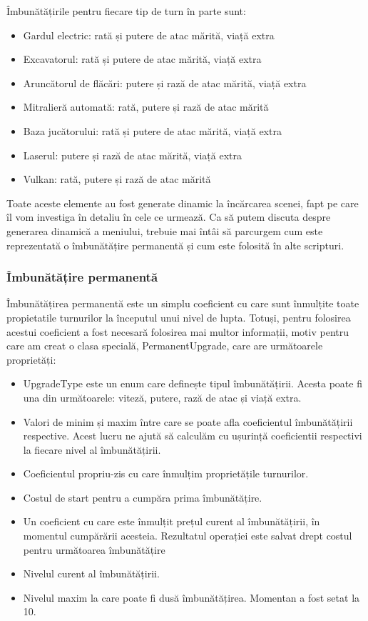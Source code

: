 \documentclass[12pt, a4paper]{article}
\begin{document}
	Îmbunătățirile pentru fiecare tip de turn în parte sunt:
	
	\begin{itemize}
		\item Gardul electric: rată și putere de atac mărită, viață extra
		\item Excavatorul: rată și putere de atac mărită, viață extra
		\item Aruncătorul de flăcări: putere și rază de atac mărită, viață extra
		\item Mitralieră automată: rată, putere și rază de atac mărită
		\item Baza jucătorului: rată și putere de atac mărită, viață extra
		\item Laserul: putere și rază de atac mărită, viață extra
		\item Vulkan: rată, putere și rază de atac mărită
	\end{itemize}
	
	Toate aceste elemente au fost generate dinamic la încărcarea scenei, fapt pe care îl vom investiga în detaliu în cele ce urmează. Ca să putem discuta despre generarea dinamică a meniului, trebuie mai întâi să parcurgem cum este reprezentată o îmbunătățire permanentă și cum este folosită în alte scripturi.
	
	
	
	
	
	\subsubsection{Îmbunătățire permanentă}
	
	Îmbunătățirea permanentă este un simplu coeficient cu care sunt înmulțite toate propietatile turnurilor la începutul unui nivel de lupta. Totuși, pentru folosirea acestui coeficient a fost necesară folosirea mai multor informații, motiv pentru care am creat o clasa specială, PermanentUpgrade, care are următoarele proprietăți:
	
	\begin{itemize}
		\item UpgradeType este un enum care definește tipul îmbunătățirii. Acesta poate fi una din următoarele: viteză, putere, rază de atac și viață extra.
		\item Valori de minim și maxim între care se poate afla coeficientul îmbunătățirii respective. Acest lucru ne ajută să calculăm cu ușurință coeficientii respectivi la fiecare nivel al îmbunătățirii.
		\item Coeficientul propriu-zis cu care înmulțim proprietățile turnurilor.
		\item Costul de start pentru a cumpăra prima îmbunătățire.
		\item Un coeficient cu care este înmulțit prețul curent al îmbunătățirii, în momentul cumpărării acesteia. Rezultatul operației este salvat drept costul pentru următoarea îmbunătățire
		\item Nivelul curent al îmbunătățirii.
		\item Nivelul maxim la care poate fi dusă îmbunătățirea. Momentan a fost setat la 10.
	\end{itemize}
	
\end{document}
